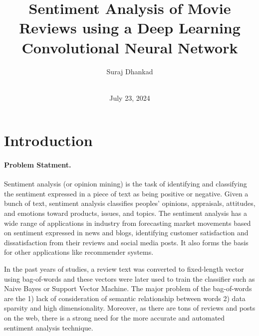 \documentclass[11pt]{article}
\begin{document}
 



\title{Sentiment Analysis of Movie Reviews using a Deep Learning Convolutional Neural Network}

\author
{Suraj Dhankad\\
\\
}


\date{July 23, 2024}





\maketitle 
\newpage

\doublespacing
\tableofcontents
\singlespacing
\newpage

\baselineskip24pt

\section{Introduction}

\paragraph*{Problem Statment.}

Sentiment analysis (or opinion mining) is the task of identifying and classifying the sentiment expressed in a piece of text as being positive or negative. 
%
Given a bunch of text, sentiment analysis classifies peoples’ opinions, appraisals, attitudes, and emotions toward products, issues, and topics. 
%
The sentiment analysis has a wide range of applications in industry from forecasting market movements based on sentiment expressed in news and blogs, identifying customer satisfaction and dissatisfaction from their reviews and social media posts. It also forms the basis for other applications like recommender systems. 

In the past years of studies, a review text was converted to fixed-length vector using bag-of-words and these vectors were later used to train the classifier such as Naive Bayes or Support Vector Machine. The major problem of the bag-of-words are the 1) lack of consideration of semantic relationship between words 2) data sparsity and high dimensionality. Moreover, as there are tons of reviews and posts on the web, there is a strong need for the more accurate and automated sentiment analysis technique.
\end{document}
